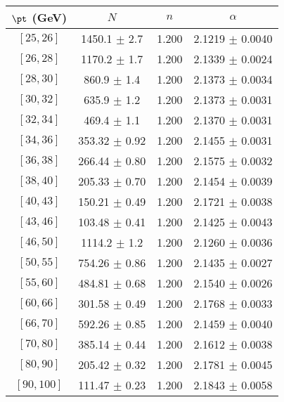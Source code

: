 \begin{tabular}{c||c|c|c}
$\pt$ (GeV) & $N$ & $n$ & $\alpha$ \\
\hline
$[25, 26]$ & 1450.1 $\pm$ 2.7 & 1.200 & 2.1219 $\pm$ 0.0040\\
$[26, 28]$ & 1170.2 $\pm$ 1.7 & 1.200 & 2.1339 $\pm$ 0.0024\\
$[28, 30]$ & 860.9 $\pm$ 1.4 & 1.200 & 2.1373 $\pm$ 0.0034\\
$[30, 32]$ & 635.9 $\pm$ 1.2 & 1.200 & 2.1373 $\pm$ 0.0031\\
$[32, 34]$ & 469.4 $\pm$ 1.1 & 1.200 & 2.1370 $\pm$ 0.0031\\
$[34, 36]$ & 353.32 $\pm$ 0.92 & 1.200 & 2.1455 $\pm$ 0.0031\\
$[36, 38]$ & 266.44 $\pm$ 0.80 & 1.200 & 2.1575 $\pm$ 0.0032\\
$[38, 40]$ & 205.33 $\pm$ 0.70 & 1.200 & 2.1454 $\pm$ 0.0039\\
$[40, 43]$ & 150.21 $\pm$ 0.49 & 1.200 & 2.1721 $\pm$ 0.0038\\
$[43, 46]$ & 103.48 $\pm$ 0.41 & 1.200 & 2.1425 $\pm$ 0.0043\\
$[46, 50]$ & 1114.2 $\pm$ 1.2 & 1.200 & 2.1260 $\pm$ 0.0036\\
$[50, 55]$ & 754.26 $\pm$ 0.86 & 1.200 & 2.1435 $\pm$ 0.0027\\
$[55, 60]$ & 484.81 $\pm$ 0.68 & 1.200 & 2.1540 $\pm$ 0.0026\\
$[60, 66]$ & 301.58 $\pm$ 0.49 & 1.200 & 2.1768 $\pm$ 0.0033\\
$[66, 70]$ & 592.26 $\pm$ 0.85 & 1.200 & 2.1459 $\pm$ 0.0040\\
$[70, 80]$ & 385.14 $\pm$ 0.44 & 1.200 & 2.1612 $\pm$ 0.0038\\
$[80, 90]$ & 205.42 $\pm$ 0.32 & 1.200 & 2.1781 $\pm$ 0.0045\\
$[90, 100]$ & 111.47 $\pm$ 0.23 & 1.200 & 2.1843 $\pm$ 0.0058\\
\end{tabular}
